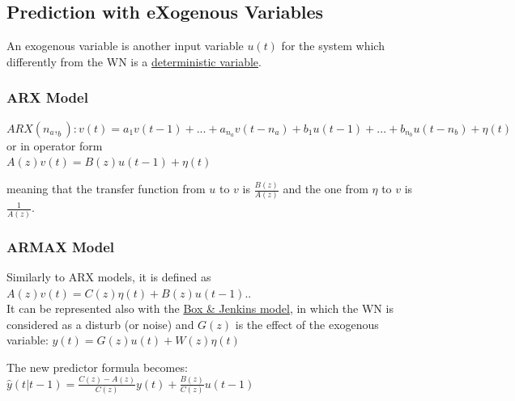\documentclass[10pt,a4paper]{article}
\begin{document}
\subsection{Prediction with eXogenous Variables}
An exogenous variable is another input variable $u(t)$ for the system which differently from the WN is a \uline{deterministic variable}.
\subsubsection{ARX Model}
\center $ARX(n_a,_b): v(t)=a_1v(t-1)+...+a_{n_a}v(t-n_a)+b_1u(t-1)+...+b_{n_b}u(t-n_b)+\eta(t)$ 
\\ \vspace{0.3em}
or in operator form
\\ \vspace{0.3em}
$A(z)v(t)=B(z)u(t-1)+\eta(t)$
\\ \raggedright \vspace{0.5em}
meaning that the transfer function from $u$ to $v$ is $\frac{B(z)}{A(z)}$ and the one from $\eta$ to $v$ is $\frac{1}{A(z)}$.
\subsubsection{ARMAX Model}
Similarly to ARX models, it is defined as $A(z)v(t)=C(z)\eta(t)+B(z)u(t-1).$. \\
It can be represented also with the \uline{Box \& Jenkins model}, in which the WN is considered as a disturb (or noise) and $G(z)$ is the effect of the exogenous variable: 
\center 
$y(t)=G(z)u(t)+W(z)\eta(t)$
\\ \raggedright \vspace{0.5em}
The new predictor formula becomes:
\center 
$\hat{y}(t|t-1)=\frac{C(z)-A(z)}{C(z)}y(t)+\frac{B(z)}{C(z)}u(t-1)$
\\ \raggedright
\end{document}
